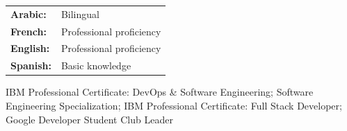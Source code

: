 \begin{minipage}[t]{0.42\textwidth}
    \renewcommand{\arraystretch}{1.2}

    \begin{tabular}{>{\bfseries}l l}
        Arabic: & Bilingual \\
        French: & Professional proficiency \\
        English: & Professional proficiency \\
        Spanish: & Basic knowledge \\
    \end{tabular}
\end{minipage}
\hfill
\begin{minipage}[t]{0.53\textwidth}

    \footnotesize
    IBM Professional Certificate: DevOps \& Software Engineering; Software Engineering Specialization; IBM Professional Certificate: Full Stack Developer; Google Developer Student Club Leader
\end{minipage}
